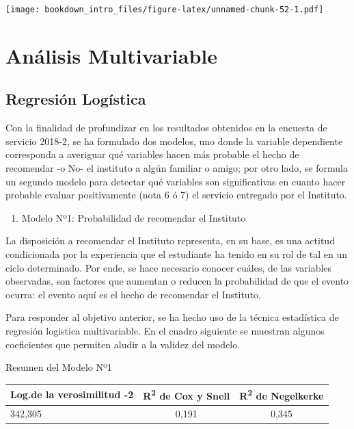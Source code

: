 \documentclass[]{book}
\providecommand{\tightlist}{%
  \setlength{\itemsep}{0pt}\setlength{\parskip}{0pt}}
\begin{document}
\texttt{[image: bookdown\_intro\_files/figure-latex/unnamed-chunk-52-1.pdf]}

\chapter{Análisis Multivariable}\label{analisis-multivariable}

\section{Regresión Logística}\label{regresion-logistica}

Con la finalidad de profundizar en los resultados obtenidos en la
encuesta de servicio 2018-2, se ha formulado dos modelos, uno donde la
variable dependiente corresponda a averiguar qué variables hacen más
probable el hecho de recomendar -o No- el instituto a algún familiar o
amigo; por otro lado, se formula un segundo modelo para detectar qué
variables son significativas en cuanto hacer probable evaluar
positivamente (nota 6 ó 7) el servicio entregado por el Instituto.

\begin{enumerate}
\def\labelenumi{\alph{enumi})}
\tightlist
\item
  Modelo Nº1: Probabilidad de recomendar el Instituto
\end{enumerate}

La disposición a recomendar el Instituto representa, en su base, es una
actitud condicionada por la experiencia que el estudiante ha tenido en
su rol de tal en un ciclo determinado. Por ende, se hace necesario
conocer cuáles, de las variables observadas, son factores que aumentan o
reducen la probabilidad de que el evento ocurra: el evento aquí es el
hecho de recomendar el Instituto.

Para responder al objetivo anterior, se ha hecho uso de la técnica
estadística de regresión logistica multivariable. En el cuadro siguiente
se muestran algunos coeficientes que permiten aludir a la validez del
modelo.

Resumen del Modelo Nº1

\begin{longtable}[]{@{}lcc@{}}
\toprule
Log.de la verosimilitud -2 & R\textsuperscript{2} de Cox y Snell &
R\textsuperscript{2} de Negelkerke\tabularnewline
\midrule
\endhead
342,305 & 0,191 & 0,345\tabularnewline
\bottomrule
\end{longtable}
\end{document}
